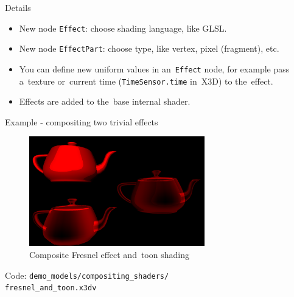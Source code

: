 \documentclass{beamer}
\begin{document}
\begin{frame}{Details}
\begin{itemize}
  \item New node \texttt{Effect}: choose shading language, like GLSL.
  \item New node \texttt{EffectPart}: choose type, like vertex, pixel (fragment), etc.
  \item You can define new uniform values in an~\texttt{Effect} node,
    for example pass a~texture or~current time (\texttt{TimeSensor.time} in~X3D)
    to the~effect.
  \item Effects are added to the~base internal shader.
\end{itemize}
\end{frame}

\begin{frame}{Example - compositing two trivial effects}
\begin{figure}
  \centering
  \includegraphics[width=3.0in]{../fresnel_and_toon}
  \caption{Composite Fresnel effect and~toon shading}
\end{figure}

Code: \texttt{demo\_models/compositing\_shaders/\\fresnel\_and\_toon.x3dv}

\end{frame}
\end{document}

